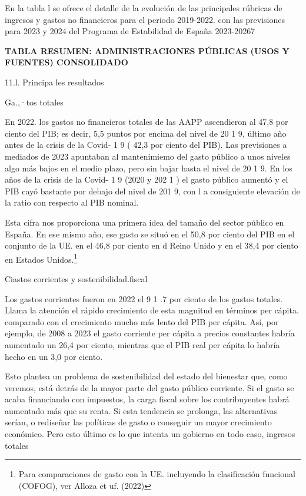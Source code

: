 \documentclass[10pt,a4paper]{article}
\begin{document}
En la tabla l se ofrece el detalle de la evolución de las principales rúbricas de ingresos y gastos no financieros para el periodo 2019-2022. con las previsiones para 2023 y 2024 del Programa de Estabilidad de España 2023-20267


\textbf{TABLA RESUMEN: ADMINISTRACIONES PÚBLICAS (USOS Y FUENTES) CONSOLIDADO}

11.l. Principa les resultados

Ga.,·tos totales
 
En 2022. los gastos no financieros totales de las AAPP ascendieron al 47,8 por ciento del PIB; es decir, 5,5 puntos por encima del nivel de 20 1 9, último año antes de la crisis de la Covid- 1 9 ( 42,3 por ciento del PIB). Las previsiones a mediados de 2023 apuntaban al mantenimiemo del gasto público a unos niveles algo más bajos en el medio plazo, pero sin bajar hasta el nivel de 20 1 9. En los años de la crisis de la Covid- 1 9 (2020 y 202 1 ) el gasto público aumentó y el PIB cayó bastante por debajo del nivel de 201 9, con l a consiguiente elevación de la ratio con respecto al PIB nominal.

Esta cifra nos proporciona una primera idea del tamaño del sector público en España. En ese mismo año, ese gasto se situó en el 50,8 por ciento del PIB en el conjunto de la UE. en el 46,8 por ciento en d Reino Unido y en el 38,4 por ciento en Estados Unidos.\footnote{%
    Para comparaciones de gasto con la UE. incluyendo la clasificación funcional (COFOG), ver Alloza et uf. (2022)
}

Ciastos corrientes y sostenibilidad.fiscal

Los gastos corrientes fueron en 2022 el 9 1 .7 por ciento de los gastos totales. Llama la atención el rápido crecimiento de esta magnitud en términos per cápita. comparado con el crecimiento mucho más lento del PIB per cápita. Así, por ejemplo, de 2008 a 2023 el gasto corriente per cápita a precios constantes habría aumentado un 26,4 por ciento, mientras que el PIB real per cápita lo habría hecho en un 3,0 por ciento.

Esto plantea un problema de sostenibilidad del estado del bienestar que, como veremos, está detrás de la mayor parte del gasto público corriente. Si el gasto se acaba financiando con impuestos, la carga fiscal sobre los contribuyentes habrá aumentado más que su renta. Si esta tendencia se prolonga, las alternativas serían, o rediseñar las políticas de gasto o conseguir un mayor crecimiento económico. Pero esto último es lo que intenta un gobierno en todo caso, ingresos totales
\end{document}
